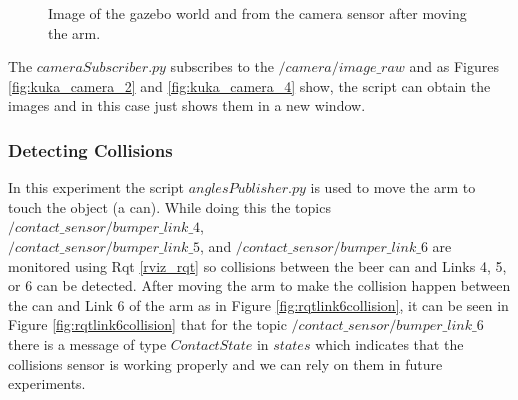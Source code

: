 \documentclass[12pt,oneside]{article}
\begin{document}
\begin{figure}[H]
  \centering
  \hfill
  \caption{Image of the gazebo world and from the camera sensor after moving the arm.}
\end{figure}

The $cameraSubscriber.py$ subscribes to the $/camera/image\_raw$ and as Figures \ref{fig:kuka_camera_2} and \ref{fig:kuka_camera_4} show, the script can obtain the images and in this case just shows them in a new window.

\subsubsection{Detecting Collisions}
In this experiment the script $anglesPublisher.py$ is used to move the arm to touch the object (a can). While doing this the topics $/contact\_sensor/bumper\_link\_4$, \\ $/contact\_sensor/bumper\_link\_5$, and $/contact\_sensor/bumper\_link\_6$ are monitored using Rqt \ref{rviz_rqt} so collisions between the beer can and Links 4, 5, or 6 can be detected.
After moving the arm to make the collision happen between the can and Link 6 of the arm as in Figure \ref{fig:rqtlink6collision}, it can be seen in Figure \ref{fig:rqtlink6collision} that for the topic $/contact\_sensor/bumper\_link\_6$ there is a message of type $ContactState$ in $states$ which indicates that the collisions sensor is working properly and we can rely on them in future experiments.
\end{document}
